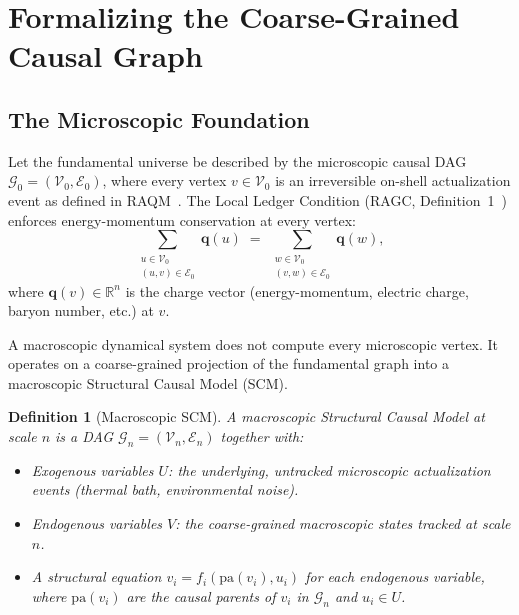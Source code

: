 \documentclass[11pt,a4paper]{article}
\newtheorem{definition}[theorem]{Definition}
\theoremstyle{remark}
\newcommand{\GG}{\mathcal{G}}
\newcommand{\VV}{\mathcal{V}}
\newcommand{\EE}{\mathcal{E}}
\begin{document}
\section{Formalizing the Coarse-Grained Causal Graph}
\label{sec:coarsegrain}

\subsection{The Microscopic Foundation}

Let the fundamental universe be described by the microscopic causal DAG
$\GG_0 = (\VV_0, \EE_0)$, where every vertex $v \in \VV_0$ is an irreversible
on-shell actualization event as defined in RAQM~\citep{Sandeman2026a}. The Local
Ledger Condition (RAGC, Definition~1~\citep{Sandeman2026b}) enforces
energy-momentum conservation at every vertex:
\begin{equation}
  \sum_{\substack{u \in \VV_0 \\ (u,v)\in\EE_0}} \mathbf{q}(u)
  \;=\;
  \sum_{\substack{w \in \VV_0 \\ (v,w)\in\EE_0}} \mathbf{q}(w),
\end{equation}
where $\mathbf{q}(v) \in \mathbb{R}^n$ is the charge vector (energy-momentum,
electric charge, baryon number, etc.) at $v$.

A macroscopic dynamical system does not compute every microscopic vertex. It
operates on a coarse-grained projection of the fundamental graph into a
macroscopic Structural Causal Model (SCM).

\begin{definition}[Macroscopic SCM]
A \emph{macroscopic Structural Causal Model} at scale $n$ is a DAG
$\GG_n = (\VV_n, \EE_n)$ together with:
\begin{itemize}[noitemsep]
  \item \emph{Exogenous variables} $U$: the underlying, untracked microscopic
    actualization events (thermal bath, environmental noise).
  \item \emph{Endogenous variables} $V$: the coarse-grained macroscopic states
    tracked at scale $n$.
  \item A structural equation $v_i = f_i(\mathrm{pa}(v_i), u_i)$ for each
    endogenous variable, where $\mathrm{pa}(v_i)$ are the causal parents of
    $v_i$ in $\GG_n$ and $u_i \in U$.
\end{itemize}
\end{definition}
\end{document}
